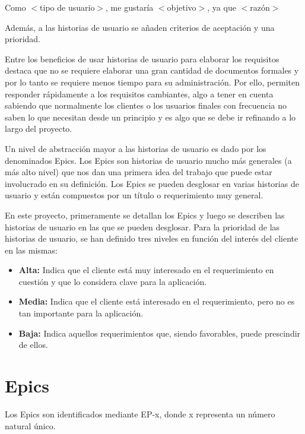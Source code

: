 \begin{center}
Como $<$tipo de usuario$>$, me gustaría $<$objetivo$>$, ya que $<$razón$>$
\end{center}

Además, a las historias de usuario se añaden criterios de aceptación y una prioridad.

Entre los beneficios de usar historias de usuario para elaborar los requisitos destaca que no se requiere elaborar una gran cantidad de documentos formales y por lo tanto se requiere menos tiempo para su administración. Por ello, permiten responder rápidamente a los requisitos cambiantes, algo a tener en cuenta sabiendo que normalmente los clientes o los usuarios finales con frecuencia no saben lo que necesitan desde un principio y es algo que se debe ir refinando a lo largo del proyecto.

Un nivel de abstracción mayor a las historias de usuario es dado por los denominados Epics. Los Epics son historias de usuario mucho más generales (a más alto nivel) que nos dan una primera idea del trabajo que puede estar involucrado en su definición. Los Epics se pueden desglosar en varias historias de usuario y están compuestos por un título o requerimiento muy general.

En este proyecto, primeramente se detallan los Epics y luego se describen las historias de usuario en las que se pueden desglosar. Para la prioridad de las historias de usuario, se han definido tres niveles en función del interés del cliente en las mismas:

\begin{itemize}
\item \textbf{Alta:} Indica que el cliente está muy interesado en el requerimiento en cuestión y que lo considera clave para la aplicación.
\item \textbf{Media:} Indica que el cliente está interesado en el requerimiento, pero no es tan importante para la aplicación. 
\item \textbf{Baja:} Indica aquellos requerimientos que, siendo favorables, puede prescindir de ellos.
\end{itemize}


\section{Epics} \label{epics}
Los Epics son identificados mediante EP-x, donde x representa un número natural único.

